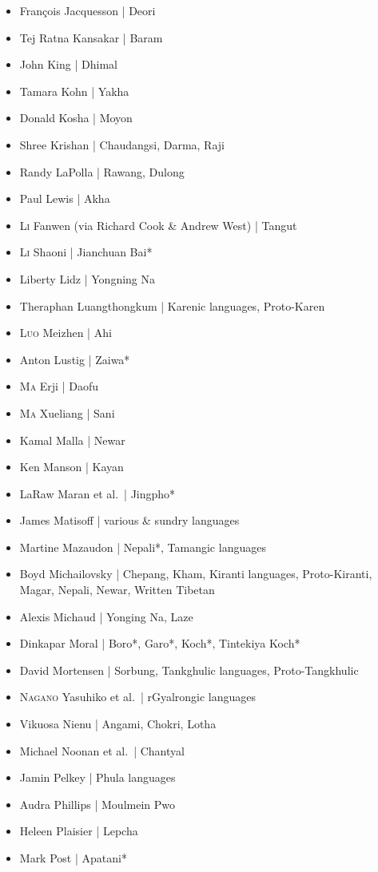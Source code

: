 \begin{itemize}
\item François Jacquesson | Deori
\item Tej Ratna Kansakar | Baram
\item John King | Dhimal
\item Tamara Kohn | Yakha
\item Donald Kosha | Moyon
\item Shree Krishan | Chaudangsi, Darma, Raji
\item Randy LaPolla | Rawang, Dulong
\item Paul Lewis | Akha
\item \textsc{Li} Fanwen (via Richard Cook \& Andrew West) | Tangut
\item \textsc{Li} Shaoni | Jianchuan Bai*
\item Liberty Lidz | Yongning Na
\item Theraphan Luangthongkum | Karenic languages, Proto-Karen
\item \textsc{Luo} Meizhen | Ahi
\item Anton Lustig | Zaiwa*
\item \textsc{Ma} Erji | Daofu
\item \textsc{Ma} Xueliang | Sani
\item Kamal Malla | Newar
\item Ken Manson | Kayan
\item LaRaw Maran et al.\ | Jingpho*
\item James Matisoff | various \& sundry languages
\item Martine Mazaudon | Nepali*, Tamangic languages
\item Boyd Michailovsky | Chepang, Kham, Kiranti languages, Proto-Kiranti, Magar, Nepali, Newar, Written Tibetan
\item Alexis Michaud | Yonging Na, Laze
\item Dinkapar Moral | Boro*, Garo*, Koch*, Tintekiya Koch*
\item David Mortensen | Sorbung, Tankghulic languages, Proto-Tangkhulic
\item \textsc{Nagano} Yasuhiko et al.\ | rGyalrongic languages
\item Vikuosa Nienu | Angami, Chokri, Lotha
\item Michael Noonan et al.\ | Chantyal
\item Jamin Pelkey | Phula languages
\item Audra Phillips | Moulmein Pwo
\item Heleen Plaisier | Lepcha
\item Mark Post | Apatani*

\end{itemize}

